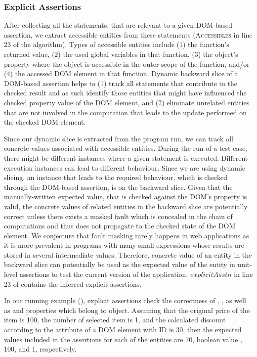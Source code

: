 \subsubsection{Explicit Assertions} \label{Sec:explicitAssertions}
After collecting all the statements, that are relevant to a given DOM-based assertion, we extract accessible entities from these statements (\textsc{Accessibles} in line 23 of the algorithm).
Types of accessible entities include (1) the function's returned value, (2) the used global variables in that function, (3) the object's property where the object is accessible in the outer scope of the function, and/or (4) the accessed DOM element in that function. Dynamic backward slice of a DOM-based assertion helps to (1) track all statements that contribute to the checked result and as such identify those entities that might have influenced the checked property value of the DOM element, and (2) eliminate unrelated entities that are not involved in the computation that leads to the update performed on the checked DOM element.

Since our dynamic slice is extracted from the program run, we can track all concrete values associated with accessible entities.
During the run of a test case, there might be different instances where a given statement is executed. Different execution instances can lead to different behaviour. Since we are using dynamic slicing, an instance that leads to the required behaviour, which is checked through the DOM-based assertion, is on the backward slice. Given that the manually-written expected value, that is checked against the DOM's property is valid, the concrete values of related entities in the backward slice are potentially correct unless there exists a masked fault which is concealed in the chain of computations and thus does not propagate to the checked state of the DOM element. We conjecture that fault masking rarely happens in \javascript web applications as it is more prevalent in programs with many small expressions whose results are stored in several intermediate values. Therefore, concrete value of an entity in the backward slice can potentially be used as the expected value of the entity in unit-level assertions to test the current version of the application.
$explicitAsstn$ in line 23 of  contains the inferred explicit assertions.

In our running example (), explicit assertions check the correctness of , , as well as  and  properties which belong to  object.  
Assuming that the original price of the item is 100, the number of selected item is 1, and the calculated discount according to the  attribute of a DOM element with ID  is 30, then the expected values included in the assertions for each of the entities are 70, boolean value , 100, and 1, respectively.  


